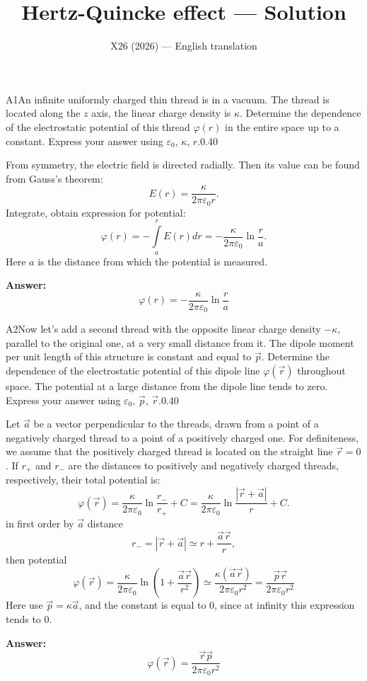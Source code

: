 \documentclass[11pt,a4paper]{article}
\title{\textbf{Hertz-Quincke effect --- Solution}}
\author{\normalsize X26 (2026) — English translation}
\date{}
\begin{document}
\maketitle\vspace{-0.5em}
\begin{solcard}{A1}{An infinite uniformly charged thin thread is in a vacuum. The thread is located along the $z$ axis, the linear charge density is $\kappa$.  Determine the dependence of the electrostatic potential of this thread $\varphi(r)$ in the entire space up to a constant. Express your answer using $\varepsilon_0$, $\kappa$, $r$.}{0.40}

From symmetry, the electric field is directed radially. Then its value can be found from Gauss’s theorem: $$ E(r)=\dfrac{\kappa}{2\pi\varepsilon_0 r}. $$Integrate, obtain expression for potential: $$ \varphi(r)=-\int\limits_{a}^{r} E(r) dr =-\dfrac{\kappa}{2\pi\varepsilon_0 }\ln{\frac{r}{a}}. $$Here $a$ is the distance from which the potential is measured.

\par\smallskip\noindent\textbf{Answer:} $$ \varphi(r)=-\dfrac{\kappa}{2\pi\varepsilon_0 }\ln{\frac{r}{a}} $$
\end{solcard}

\begin{solcard}{A2}{Now let's add a second thread with the opposite linear charge density $-\kappa$, parallel to the original one, at a very small distance from it. The dipole moment per unit length of this structure is constant and equal to $\vec p$. Determine the dependence of the electrostatic potential of this dipole line $\varphi(\vec r)$ throughout space. The potential at a large distance from the dipole line tends to zero. Express your answer using $\varepsilon_0$, $\vec p$, $\vec r$.}{0.40}

Let $\vec a$ be a vector perpendicular to the threads, drawn from a point of a negatively charged thread to a point of a positively charged one. For definiteness, we assume that the positively charged thread is located on the straight line $\vec r=0$. If $r_+$ and $r_-$ are the distances to positively and negatively charged threads, respectively, their total potential is: $$ \varphi(\vec{r})= \dfrac{\kappa}{2\pi\varepsilon_0 }\ln{\dfrac{r_-}{r_+}}+C= \dfrac{\kappa}{2\pi\varepsilon_0 }\ln\frac{|\vec{r} + \vec{a}|}{r}+ C. $$in first order by $\vec{a}$ distance $$ r_- = |\vec{r} + \vec{a}| \simeq r + \frac{\vec{a}\vec{r}}{r}, $$then potential $$ \varphi(\vec{r}) = \frac{\kappa}{2 \pi \varepsilon_0} \ln \left(1 + \frac{\vec{a}\vec{r}}{r^2} \right) \simeq \frac{\kappa (\vec{a}\vec{r}) }{2 \pi \varepsilon_0 r^2}=\frac{\vec{p} \vec{r} }{2 \pi \varepsilon_0 r^2} $$Here use  $\vec p=\kappa\vec a$, and the constant is equal to 0, since at infinity this expression tends to 0.

\par\smallskip\noindent\textbf{Answer:} \[\varphi(\vec{r})=\dfrac{ \vec r \vec p}{2\pi\varepsilon_0 r^2}\]
\end{solcard}
\end{document}
